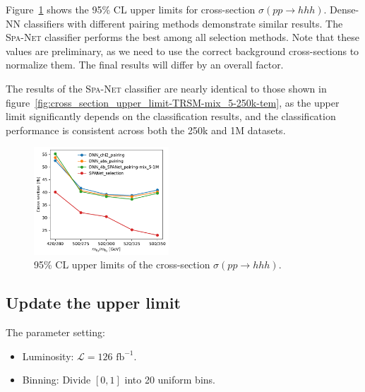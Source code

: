 \documentclass[12pt]{article}
\begin{document}
        Figure~\ref{fig:cross_section_upper_limit-TRSM-mix_5-1M-tem} shows the 95\% CL upper limits for cross-section $\sigma\left( pp \to hhh \right)$. Dense-NN classifiers with different pairing methods demonstrate similar results. The \textsc{Spa-Net} classifier performs the best among all selection methods. Note that these values are preliminary, as we need to use the correct background cross-sections to normalize them. The final results will differ by an overall factor.

        The results of the \textsc{Spa-Net} classifier are nearly identical to those shown in figure~\ref{fig:cross_section_upper_limit-TRSM-mix_5-250k-tem}, as the upper limit significantly depends on the classification results, and the classification performance is consistent across both the 250k and 1M datasets.
        \begin{figure}[htpb]
            \centering
            \includegraphics[width=0.45\textwidth]{cross_section_upper_limit-TRSM-mix_5-1M.pdf}
            \caption{95\% CL upper limits of the cross-section $\sigma\left( pp \to hhh \right)$.}
            \label{fig:cross_section_upper_limit-TRSM-mix_5-1M-tem}
        \end{figure}
    \subsection{Update the upper limit}%
    \label{sub:update_the_upper_limit}
        The parameter setting:
        \begin{itemize}
            \item Luminosity: $\mathcal{L} = \text{126 fb}^{-1}$. 
            \item Binning: Divide $[0,1]$ into 20 uniform bins. 
        \end{itemize}
\end{document}

